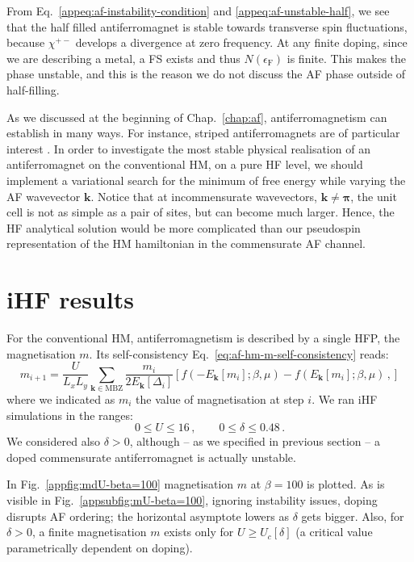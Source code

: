From Eq.~\eqref{appeq:af-instability-condition} and \eqref{appeq:af-unstable-half}, we see that the half filled antiferromagnet is stable towards transverse spin fluctuations, because $\chi^{+-}$ develops a divergence at zero frequency. At any finite doping, since we are describing a metal, a FS exists and thus $N(\epsilon_\mathrm{F})$ is finite. This makes the phase unstable, and this is the reason we do not discuss the AF phase outside of half-filling.

As we discussed at the beginning of Chap.~\ref{chap:af}, antiferromagnetism can establish in many ways. For instance, striped antiferromagnets are of particular interest \cite{wietek2021stripes}. In order to investigate the most stable physical realisation of an antiferromagnet on the conventional HM, on a pure HF level, we should implement a variational search for the minimum of free energy while varying the AF wavevector $\mathbf{k}$. Notice that at incommensurate wavevectors, $\mathbf{k} \neq \bm{\pi}$, the unit cell is not as simple as a pair of sites, but can become much larger. Hence, the HF analytical solution would be more complicated than our pseudospin representation of the HM hamiltonian in the commensurate AF channel.

\section{iHF results}\label{appsubsec:af-ihf-results}

For the conventional HM, antiferromagnetism is described by a single HFP, the magnetisation $m$. Its self-consistency Eq.~\eqref{eq:af-hm-m-self-consistency} reads: \begin{equation}\label{appeq:af-hm-m-self-consistency-iterative}
	m_{i+1} =
	\frac{U}{L_x L_y} \sum_{\mathbf{k} \in \mathrm{MBZ}} \frac{m_i}{2E_\mathbf{k}[\Delta_i]} \left[
	f(-E_\mathbf{k}[m_i];\beta,\mu)-f(E_\mathbf{k}[m_i];\beta,\mu) \, ,
	\right]
\end{equation}
where we indicated as $m_i$ the value of magnetisation at step $i$. We ran iHF simulations in the ranges:
\[
	0 \le U \le 16 \, ,
	\qquad
	0 \le \delta \le 0.48 \, .
\]
We considered also $\delta>0$, although -- as we specified in previous section -- a doped commensurate antiferromagnet is actually unstable.

In Fig.~\ref{appfig:mdU-beta=100} magnetisation $m$ at $\beta=100$ is plotted. As is visible in Fig.~\ref{appsubfig:mU-beta=100}, ignoring instability issues, doping disrupts AF ordering; the horizontal asymptote lowers as $\delta$ gets bigger. Also, for $\delta > 0$, a finite magnetisation $m$ exists only for $U \ge U_c[\delta]$ (a critical value parametrically dependent on doping).

